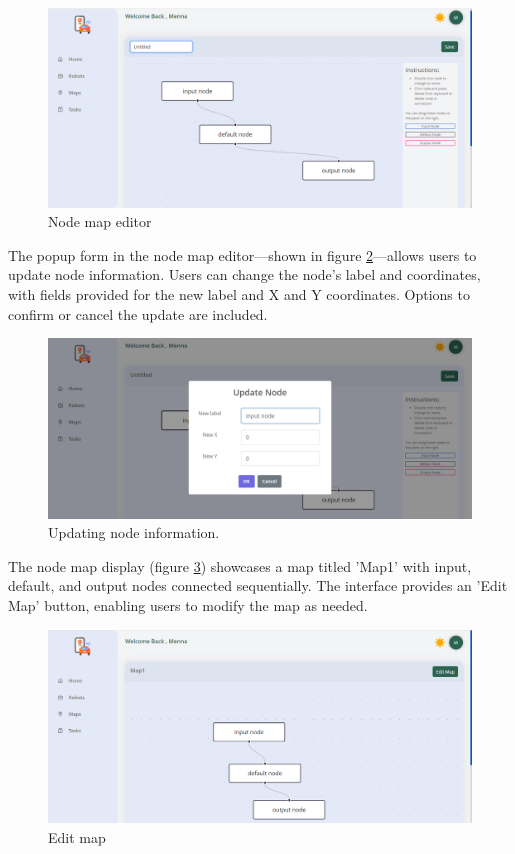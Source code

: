     \begin{figure}[h!]
        \centering
        \includegraphics[scale=0.4]{./Figures/WebApp/newMap.png}
        \caption{Node map editor}
        \label{fig:node-map-editor}
    \end{figure}

\newpage

    The popup form in the node map editor---shown in figure \ref{fig:edit-node}---allows users to update node information. Users can change the node's label and coordinates, with fields provided for the new label and X and Y coordinates. Options to confirm or cancel the update are included.

    \begin{figure}[h!]
        \centering
        \includegraphics[scale=0.4]{./Figures/WebApp/editNode.png}
        \caption{Updating node information.}
        \label{fig:edit-node}
    \end{figure}

    The node map display (figure \ref{fig:edit-map}) showcases a map titled 'Map1' with input, default, and output nodes connected sequentially. The interface provides an 'Edit Map' button, enabling users to modify the map as needed.


    \begin{figure}[h!]
        \centering
        \includegraphics[scale=0.4]{./Figures/WebApp/editMap.png}
        \caption{Edit map}
        \label{fig:edit-map}
    \end{figure}

